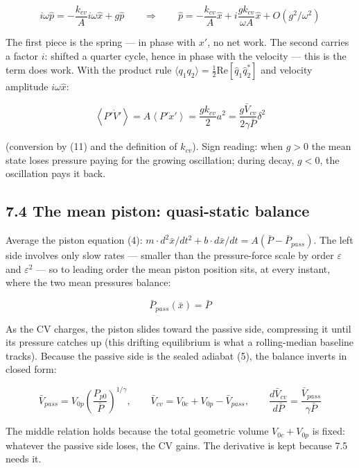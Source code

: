 \documentclass[11pt]{article}
\begin{document}
\[
i\omega\hat p = -\frac{k_{cv}}{A}i\omega\hat x + g\hat p \qquad\Longrightarrow\qquad \hat p = -\frac{k_{cv}}{A}\hat x + i\frac{gk_{cv}}{\omega A}\hat x + O(g^2/\omega^2)
\]

The first piece is the spring --- in phase with $x'$, no net work. The second carries a factor $i$: shifted a quarter cycle, hence in phase with the velocity --- this is the term does work. With the product rule $\langle q_1q_2\rangle = \frac{1}{2}\mathrm{Re}[\hat q_1\hat q_2^*]$ and velocity amplitude $i\omega\hat x$:

\begin{equation}
\left\langle P'\dot V'\right\rangle = A\left\langle P'\dot x'\right\rangle = \frac{gk_{cv}}{2}a^2 = \frac{g\bar V_{cv}}{2\gamma\bar P}\delta^2 \tag{24}
\end{equation}

(conversion by (11) and the definition of $k_{cv}$). Sign reading: when $g > 0$ the mean state loses pressure paying for the growing oscillation; during decay, $g < 0$, the oscillation pays it back.

\subsection*{7.4 The mean piston: quasi-static balance}

Average the piston equation (4): $m \cdot d^2\bar x/dt^2 + b \cdot d\bar x/dt = A(\bar P - \bar P_{pass})$. The left side involves only slow rates --- smaller than the pressure-force scale by order $\varepsilon$ and $\varepsilon^2$ --- so to leading order the mean piston position sits, at every instant, where the two mean pressures balance:

\[
\bar P_{pass}(\bar x) = \bar P
\]

As the CV charges, the piston slides toward the passive side, compressing it until its pressure catches up (this drifting equilibrium is what a rolling-median baseline tracks). Because the passive side is the sealed adiabat (5), the balance inverts in closed form:

\begin{equation}
\bar V_{pass} = V_{0p}\left(\frac{P_{p0}}{\bar P}\right)^{1/\gamma}, \qquad \bar V_{cv} = V_{0c} + V_{0p} - \bar V_{pass}, \qquad \frac{d\bar V_{cv}}{d\bar P} = \frac{\bar V_{pass}}{\gamma\bar P} \tag{25}
\end{equation}

The middle relation holds because the total geometric volume $V_{0c} + V_{0p}$ is fixed: whatever the passive side loses, the CV gains. The derivative is kept because 7.5 needs it.
\end{document}
